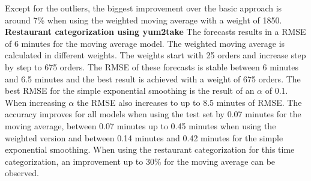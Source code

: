 Except for the outliers, the biggest improvement over the basic approach is around 7\% when using the weighted moving average with a weight of 1850.
\newline\newline\textbf{Restaurant categorization using yum2take}\newline
The forecasts results in a RMSE of 6 minutes for the moving average model. The weighted moving average is calculated in different weights. The weights start with 25 orders and increase step by step to 675 orders. The RMSE of these forecasts is stable between 6 minutes and 6.5 minutes and the best result is achieved with a weight of 675 orders. The best RMSE for the simple exponential smoothing is the result of an $\alpha$ of 0.1. When increasing $\alpha$ the RMSE also increases to up to 8.5 minutes of RMSE. The accuracy improves for all models when using the test set by 0.07 minutes for the moving average, between 0.07 minutes up to 0.45 minutes when using the weighted version and between 0.14 minutes and 0.42 minutes for the simple exponential smoothing.\newline
When using the restaurant categorization for this time categorization, an improvement up to 30\% for the moving average can be observed.
